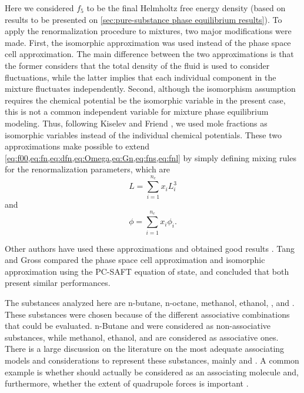 \documentclass[preprint,12pt,3p]{elsarticle}
\begin{document}
Here we considered $f_{5}$ to be the final Helmholtz free energy density (based on results to be presented on \cref{sec:pure-substance phase equilibrium results}).
To apply the renormalization procedure to mixtures, two major modifications were made.
First, the isomorphic approximation \citep{fisher1968renormalization} was used instead of the phase space cell approximation.
The main difference between the two approximations is that the former considers that the total density of the fluid is used to consider fluctuations, while the latter implies that each individual component in the mixture fluctuates independently.
Second, although the isomorphism assumption requires the chemical potential be the isomorphic variable in the present case, this is not a common independent variable for mixture phase equilibrium modeling.
Thus, following Kiselev and Friend \citep{kiselev1999cubic}, we used mole fractions as isomorphic variables instead of the individual chemical potentials.
These two approximations make possible to extend \cref{eq:f00,eq:fn,eq:dfn,eq:Omega,eq:Gn,eq:fns,eq:fnl} by simply defining mixing rules for the renormalization parameters, which are
\begin{equation} \label{eq:mix_L}
L = \sum_{i=1}^{n_c}x_{i}L_{i}^{3}
\end{equation}
and
\begin{equation} \label{eq:mix_phi}
\phi = \sum_{i=1}^{n_c}x_{i}\phi_{i}.
\end{equation}

Other authors have used these approximations and obtained good results \cite{cai2004thermodynamics, llovell2006global, sun2005application, pcm2017application, xu2011prediction}.
Tang and Gross \citep{tang2010renormalization} compared the phase space cell approximation and isomorphic approximation using the PC-SAFT equation of state, and concluded that both present similar performances.

The substances analyzed here are n-butane, n-octane, methanol, ethanol, , and .
These substances were chosen because of the different associative combinations that could be evaluated.
n-Butane and  were considered as non-associative substances, while methanol, ethanol, and  are considered as associative ones.
There is a large discussion on the literature on the most adequate associating models and considerations to represent these substances, mainly  \citep{bjorner2016modeling} and  \citep{ruffine2006represent}.
A common example is whether  should actually be considered as an associating molecule and, furthermore, whether the extent of quadrupole forces is important \cite{tsivintzelis2011modeling,bjorner2016modeling}.
\end{document}
